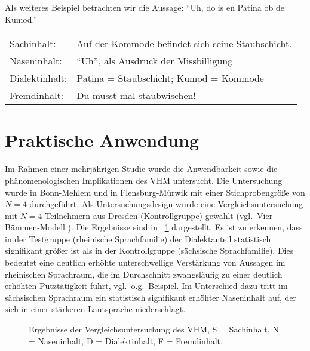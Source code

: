 \documentclass[11pt,DIV16,twocolumn]{scrartcl}
\begin{document}
%
Als weiteres Beispiel betrachten wir die Aussage: "`Uh, do is en
Patina ob de Kumod."'
%
\begin{center}
  \begin{tabularx}{\linewidth}{lX}
    Sachinhalt: & Auf der Kommode befindet sich seine Staubschicht. \\
    Naseninhalt: & "`Uh"', als Ausdruck der Missbilligung \\
    Dialektinhalt: & Patina = Staubschicht; Kumod = Kommode \\
    Fremdinhalt: & Du musst mal staubwischen!
  \end{tabularx}
\end{center}

\section{Praktische Anwendung}

Im Rahmen einer mehrjährigen Studie wurde die Anwendbarkeit sowie die
phänomenologischen Implikationen des VHM untersucht.  Die Untersuchung
wurde in Bonn-Mehlem und in Flensburg-Mürwik mit einer
Stichprobengröße von $N=4$ durchgeführt.  Als Untersuchungsdesign
wurde eine Vergleichsuntersuchung mit $N=4$ Teilnehmern aus Dresden
(Kontrollgruppe) gewählt (vgl.\ Vier-Bämmen-Modell \cite{VBM}).  Die
Ergebnisse sind in \figurename~\ref{fig:VHM} dargestellt.  Es ist zu
erkennen, dass in der Testgruppe (rheinische Sprachfamilie) der
Dialektanteil statistisch signifikant größer ist als in der
Kontrollgruppe (sächsische Sprachfamilie).  Dies bedeutet eine
deutlich erhöhte unterschwellige Verstärkung von Aussagen im
rheinischen Sprachraum, die im Durchschnitt zwangsläufig zu einer
deutlich erhöhten Putztätigkeit führt, vgl.\ o.g.\ Beispiel.  Im
Unterschied dazu tritt im sächsischen Sprachraum ein statistisch
signifikant erhöhter Naseninhalt auf, der sich in einer stärkeren
Lautsprache niederschlägt.

\begin{figure}[tb]
  \centering
  \caption{Ergebnisse der Vergleichsuntersuchung des VHM, S =
    Sachinhalt, N = Naseninhalt, D = Dialektinhalt, F = Fremdinhalt.}
  \label{fig:VHM}
\end{figure}
\end{document}
